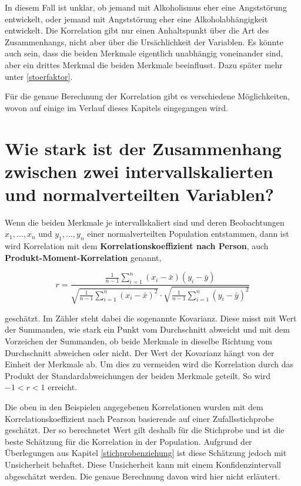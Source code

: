 \documentclass[
]{book}
\theoremstyle{definition}
\theoremstyle{definition}
\theoremstyle{definition}
\theoremstyle{definition}
\theoremstyle{remark}
\begin{document}
In diesem Fall ist unklar, ob jemand mit Alkoholismus eher eine Angststörung entwickelt, oder jemand mit Angststörung eher eine Alkoholabhängigkeit entwickelt. Die Korrelation gibt nur einen Anhaltspunkt über die Art des Zusammenhangs, nicht aber über die Ursächlichkeit der Variablen. Es könnte auch sein, dass die beiden Merkmale eigentlich unabhängig voneinander sind, aber ein drittes Merkmal die beiden Merkmale beeinflusst. Dazu später mehr unter \ref{stoerfaktor}.

Für die genaue Berechnung der Korrelation gibt es verschiedene Möglichkeiten, wovon auf einige im Verlauf dieses Kapitels eingegangen wird.

\section{Wie stark ist der Zusammenhang zwischen zwei intervallskalierten und normalverteilten Variablen?}\label{wie-stark-ist-der-zusammenhang-zwischen-zwei-intervallskalierten-und-normalverteilten-variablen}

Wenn die beiden Merkmale je intervallskaliert sind und deren Beobachtungen \(x_1, \ldots, x_n\) und \(y_1,\ldots, y_n\) einer normalverteilten Population entstammen, dann ist wird Korrelation mit dem \label{customdef-pearson-korrelation}{\textbf{Korrelationskoeffizient nach Person}}, auch \label{customdef-podukt-moment-korrelation}{\textbf{Produkt-Moment-Korrelation}} genannt,

\[
r = \frac{\frac{1}{n-1} \sum_{i=1}^n (x_i - \bar{x})(y_i - \bar{y})}{\sqrt{\frac{1}{n-1}\sum_{i=1}^n (x_i - \bar{x})^2}\cdot \sqrt{\frac{1}{n-1}\sum_{i=1}^n (y_i - \bar{y})^2}}
\]

geschätzt. Im Zähler steht dabei die sogenannte Kovarianz. Diese misst mit Wert der Summanden, wie stark ein Punkt vom Durchschnitt abweicht und mit dem Vorzeichen der Summanden, ob beide Merkmale in dieselbe Richtung vom Durchschnitt abweichen oder nicht. Der Wert der Kovarianz hängt von der Einheit der Merkmale ab. Um dies zu vermeiden wird die Korrelation durch das Produkt der Standardabweichungen der beiden Merkmale geteilt. So wird \(-1<r<1\) erreicht.

Die oben in den Beispielen angegebenen Korrelationen wurden mit dem Korrelationskoeffizient nach Pearson basierende auf einer Zufallsstichprobe geschätzt. Der so berechnetet Wert gilt deshalb für die Stichprobe und ist die beste Schätzung für die Korrelation in der Population. Aufgrund der Überlegungen aus Kapitel \ref{stichprobenziehung} ist diese Schätzung jedoch mit Unsicherheit behaftet. Diese Unsicherheit kann mit einem Konfidenzintervall abgeschätzt werden. Die genaue Berechnung davon wird hier nicht erläutert.
\end{document}
